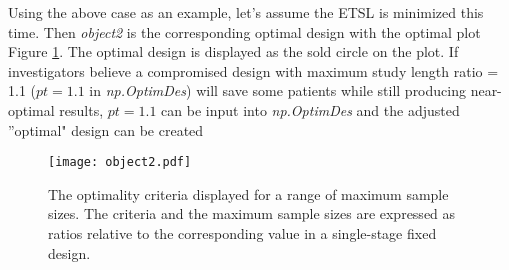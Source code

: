 \documentclass[12pt]{article}
\begin{document}
Using the above case as an example, let's assume the ETSL is minimized this time. Then {\it object2} is the corresponding
optimal design with the optimal plot Figure \ref{obj2}. The optimal design is displayed as the sold circle on the plot.
If investigators believe a compromised design with maximum study length ratio = 1.1 ($pt=1.1$ in {\it np.OptimDes}) will
save some patients while still producing near-optimal results, $pt=1.1$ can be input into {\it np.OptimDes} and the
adjusted ''optimal" design can be created


\begin{figure}[htbp]
\begin{center}
\texttt{[image: object2.pdf]}
\caption{The optimality criteria displayed for a range of maximum sample sizes.  The criteria and
the maximum sample sizes are expressed as ratios relative to the corresponding value in a
single-stage fixed design.} \label{obj2}
\end{center}
\end{figure}
\end{document}

